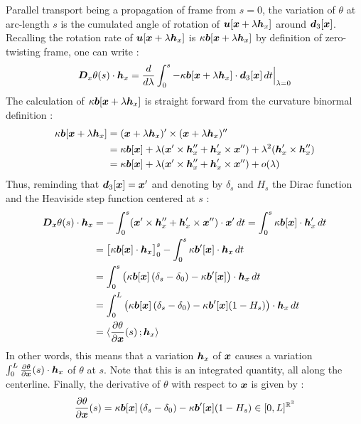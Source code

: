 Parallel transport being a propagation of frame from $s = 0$, the variation of $\theta$ at arc-length $s$ is the cumulated angle of rotation of $\boldsymbol{u}[\boldsymbol{x} + \lambda\boldsymbol{h}_x]$ around $\boldsymbol{d}_3[\boldsymbol{x}]$. Recalling the rotation rate of $\boldsymbol{u}[\boldsymbol{x} + \lambda\boldsymbol{h}_x]$ is $\kappa\boldsymbol{b}[\boldsymbol{x} + \lambda\boldsymbol{h}_x]$ by definition of zero-twisting frame, one can write :
\begin{equation}
	\boldsymbol{D}_x\theta(s)\cdot\boldsymbol{h}_x =
	\frac{d}{d\lambda} \int_0^s -\kappa\boldsymbol{b}[\boldsymbol{x} + \lambda\boldsymbol{h}_x] \cdot \boldsymbol{d}_3[\boldsymbol{x}] \,dt \Bigr|_{\lambda = 0}
\end{equation}
The calculation of $\kappa\boldsymbol{b}[\boldsymbol{x} + \lambda\boldsymbol{h}_x]$ is straight forward from the curvature binormal definition :
\begin{equation}
	\begin{aligned}
	\kappa\boldsymbol{b}[\boldsymbol{x} + \lambda\boldsymbol{h}_x]
	&= (\boldsymbol{x} + \lambda\boldsymbol{h}_x)' \times (\boldsymbol{x} + \lambda\boldsymbol{h}_x)'' \\
	&= \kappa\boldsymbol{b}[\boldsymbol{x}] + \lambda(\boldsymbol{x}'\times\boldsymbol{h}''_x + \boldsymbol{h}'_x\times\boldsymbol{x}'') + \lambda^2(\boldsymbol{h}'_x \times \boldsymbol{h}''_x) \\
	&= \kappa\boldsymbol{b}[\boldsymbol{x}] + \lambda(\boldsymbol{x}'\times\boldsymbol{h}''_x + \boldsymbol{h}'_x\times\boldsymbol{x}'') + o(\lambda)
	\end{aligned}
\end{equation}
Thus, reminding that $\boldsymbol{d}_3[\boldsymbol{x}] = \boldsymbol{x}'$ and denoting by $\delta_s$ and $H_s$ the Dirac function and the Heaviside step function centered at $s$ :
\begin{equation}
	\begin{aligned}
		\boldsymbol{D}_x\theta(s)\cdot\boldsymbol{h}_x &= - \int_0^s (\boldsymbol{x}'\times\boldsymbol{h}''_x + \boldsymbol{h}'_x\times\boldsymbol{x}'') \cdot \boldsymbol{x}' \,dt = \int_0^s \kappa\boldsymbol{b}[\boldsymbol{x}] \cdot  \boldsymbol{h}'_x \,dt\\
		&= \big[\kappa\boldsymbol{b}[\boldsymbol{x}] \cdot  \boldsymbol{h}_x \big]_0^s - \int_0^s \kappa\boldsymbol{b}'[\boldsymbol{x}] \cdot  \boldsymbol{h}_x \,dt \\
		&= \int_0^s \left(\kappa\boldsymbol{b}[\boldsymbol{x}]\left(\delta_s-\delta_0\right) - \kappa\boldsymbol{b}'[\boldsymbol{x}]\right)\cdot  \boldsymbol{h}_x \,dt \\
		&= \int_0^L \left(\kappa\boldsymbol{b}[\boldsymbol{x}]\left(\delta_s-\delta_0\right) - \kappa\boldsymbol{b}'[\boldsymbol{x}](1-H_s)\right)\cdot  \boldsymbol{h}_x \,dt \\
		&= \langle \frac{\partial\theta}{\partial\boldsymbol{x}}(s)\,; \boldsymbol{h}_x\rangle
	\end{aligned}
\end{equation}
In other words, this means that a variation $\boldsymbol{h}_x$ of $\boldsymbol{x}$ causes a variation $\int_0^L \frac{\partial\theta}{\partial\boldsymbol{x}}(s) \cdot  \boldsymbol{h}_x$ of $\theta$ at $s$. Note that this is an integrated quantity, all along the centerline. Finally, the derivative of $\theta$ with respect to $\boldsymbol{x}$ is given by :
\begin{equation}
	\frac{\partial\theta}{\partial\boldsymbol{x}}(s) = \kappa\boldsymbol{b}[\boldsymbol{x}]\left(\delta_s-\delta_0\right) - \kappa\boldsymbol{b}'[\boldsymbol{x}](1-H_s) \in [0,L]^{\mathbb{R}^3}
\end{equation}


